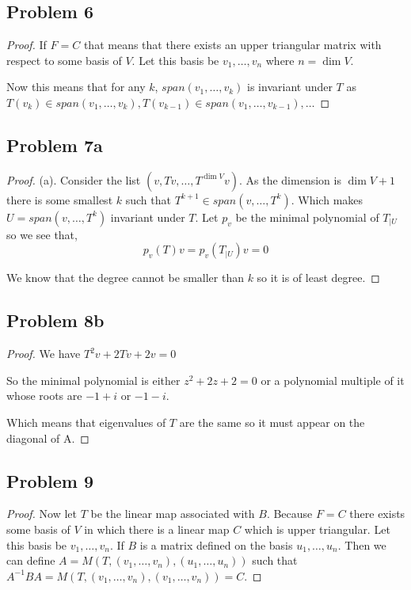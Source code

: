 \documentclass[a4paper]{report}
\begin{document}
\subsection*{Problem 6}
\begin{proof}
   If $F = C$ that means that there exists an upper triangular matrix with respect to some basis of $V$. Let this basis be $v_1,\dots,v_n$ where $n = \dim V$.

   Now this means that for any  $k$,  $span(v_1,\dots,v_k)$ is invariant under $T$ as $T(v_k) \in span(v_1,\dots,v_k), T(v_{k-1}) \in span(v_1,\dots,v_{k-1}),\dots$
\end{proof}
\subsection*{Problem 7a}
\begin{proof}
   (a). Consider the list $(v,Tv,\dots,T^{\dim V}v)$. As the dimension is $\dim V + 1$ there is some smallest $k$ such that $T^{k + 1} \in span(v,\dots,T^{k})$. Which makes $U = span(v,\dots,T^{k})$ invariant under $T$. Let $p_v$ be the minimal polynomial of $T_{|U}$ so we see that, 
   $$ p_v(T)v = p_v(T_{|U})v = 0 $$ 

   We know that the degree cannot be smaller than $k$ so it is of least degree.
\end{proof}
\subsection*{Problem 8b}
\begin{proof}
   We have $T^2v + 2Tv + 2v = 0$

   So the minimal polynomial is either $z^2 + 2z + 2 = 0$ or a polynomial multiple of it whose roots are $-1 + i$ or $-1 -i$.

   Which means that eigenvalues of  $T$ are the same so it must appear on the diagonal of A.
\end{proof}
\subsection*{Problem 9}
\begin{proof}
   Now let $T$ be the linear map associated with $B$. Because $F = C$ there exists some basis of $V$ in which there is a linear map $C$ which is upper triangular. Let this basis be $v_1,\dots,v_n$. If $B$ is a matrix defined on the basis $u_1,\dots,u_n$. Then we can define $A = M(T, (v_1,\dots,v_n),(u_1,\dots,u_n))$ such that $A^{-1}BA = M(T, (v_1,\dots,v_n), (v_1,\dots,v_n)) = C$.
\end{proof}
\end{document}
